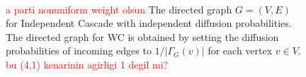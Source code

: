 \documentclass[10pt,journal,compsoc]{IEEEtran}
\newcommand\kktodo[1]{\textcolor{red}{#1}}
\begin{document}
\begin{figure}[!ht] 
    \centering
    \\%
  \caption{\protect{} 
\kktodo{a parti nonuniform weight olsun} The directed graph $G = (V, E)$ for Independent Cascade with independent diffusion probabilities. 
\protect{}
The directed graph for WC is obtained by setting the diffusion probabilities of incoming edges to $1 / |\Gamma_G(v)|$ for each vertex $v \in V$. \kktodo{bu (4,1) kenarinin agirligi 1 degil mi?} 
  }
  \label{fig:xx} 
\end{figure}
\end{document}
